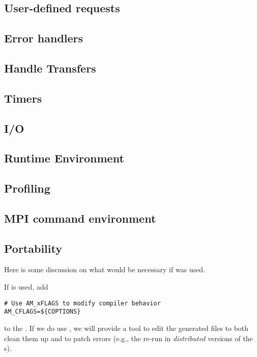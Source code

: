 \documentclass{article}
\begin{document}
\subsection{User-defined requests}
\subsection{Error handlers}
\subsection{Handle Transfers}
\subsection{Timers}
\subsection{I/O}  
\subsection{Runtime Environment}
\subsection{Profiling}
\subsection{MPI command environment}

\subsection{Portability}
Here is some discussion on what would be necessary if 
was used.

If  is used, add
\begin{verbatim}
# Use AM_xFLAGS to modify compiler behavior
AM_CFLAGS=${COPTIONS}
\end{verbatim}
to the . 
If we do use , we will provide a tool to edit the generated
files to both clean them up and to patch errors (e.g., the re-run
 in \emph{distributed} versions of the s).
\end{document}
